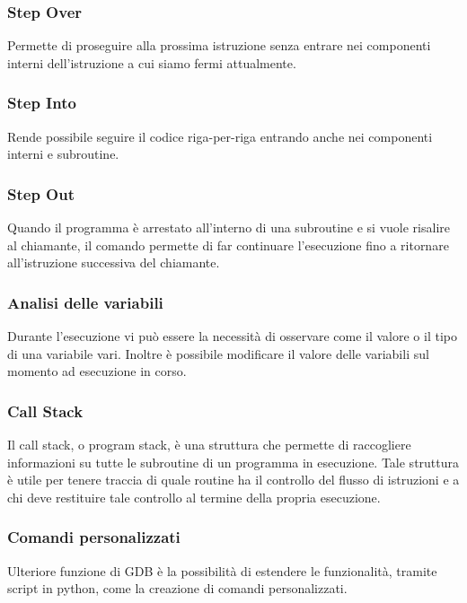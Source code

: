 \subsubsection{Step Over}
Permette di proseguire alla prossima istruzione senza entrare nei componenti interni dell'istruzione a cui siamo fermi attualmente.

\subsubsection{Step Into}
Rende possibile seguire il codice riga-per-riga entrando anche nei componenti interni e subroutine.

\subsubsection{Step Out}
Quando il programma è arrestato all'interno di una subroutine e si vuole risalire al chiamante, il comando  permette di far continuare l'esecuzione fino a ritornare all'istruzione successiva del chiamante.

\subsubsection{Analisi delle variabili}
Durante l'esecuzione vi può essere la necessità di osservare come il valore o il tipo di una variabile vari. Inoltre è possibile modificare il valore delle variabili sul momento ad esecuzione in corso.

\subsubsection{Call Stack}
Il call stack, o program stack, è una struttura che permette di raccogliere informazioni su tutte le subroutine di un programma in esecuzione. Tale struttura è utile per tenere traccia di quale routine ha il controllo del flusso di istruzioni e a chi deve restituire tale controllo al termine della propria esecuzione.

\subsubsection{Comandi personalizzati}
Ulteriore funzione di GDB è la possibilità di estendere le funzionalità, tramite script in python, come la creazione di comandi personalizzati.

